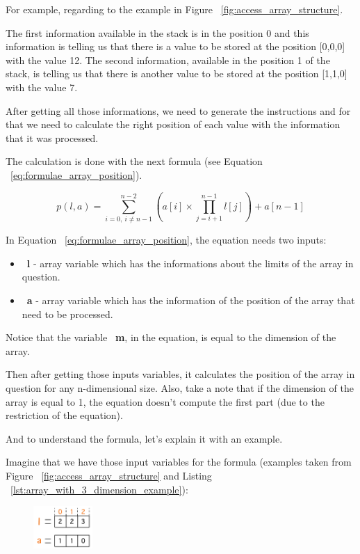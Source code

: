 \documentclass[
  oneside,
  11pt, a4paper,
  footinclude=true,
  headinclude=true,
  cleardoublepage=empty
]{scrbook}
\begin{document}
For example, regarding to the example in Figure ~\ref{fig:access_array_structure}.

The first information available in the stack is in the position 0 and this information is telling us that there is a value to be stored at the position [0,0,0] with the value 12. The second information, available in the position 1 of the stack, is telling us that there is another value to be stored at the position [1,1,0] with the value 7.

After getting all those informations, we need to generate the instructions and for that we need to calculate the right position of each value with the information that it was processed.

The calculation is done with the next formula (see Equation ~\ref{eq:formulae_array_position}).

\begin{equation} \label{eq:formulae_array_position}
  p(l,a) = \sum_{i=0,\ i\neq n-1}^{n-2} (a[i]\times\prod_{j=i+1}^{n-1} l[j])+a[n-1]
\end{equation}

In Equation ~\ref{eq:formulae_array_position}, the equation needs two inputs:

\begin{itemize}
\item ~\textbf{l} - array variable which has the informations about the limits of the array in question.
\item ~\textbf{a} - array variable which has the information of the position of the array that need to be processed.
\end{itemize}

Notice that the variable ~\textbf{m}, in the equation, is equal to the dimension of the array.

Then after getting those inputs variables, it calculates the position of the array in question for any n-dimensional size.
Also, take a note that if the dimension of the array is equal to 1, the equation doesn't compute the first part (due to the restriction of the equation).

And to understand the formula, let's explain it with an example.

Imagine that we have those input variables for the formula (examples taken from Figure ~\ref{fig:access_array_structure} and Listing ~\ref{lst:array_with_3_dimension_example}):

\begin{figure}[h!]
  \centering
    \includegraphics[width=0.2\textwidth]{img/example_position_calculation.png}
    \label{fig:example_position_calculation_structure}
\end{figure}
\end{document}
